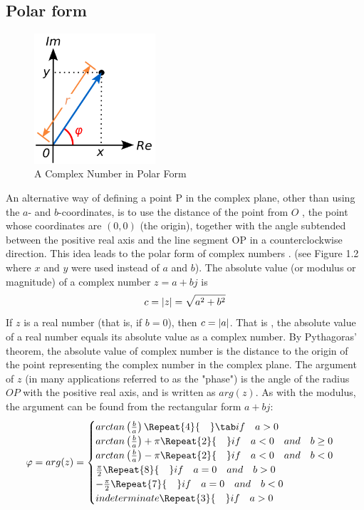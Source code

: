 \documentclass[12pt,oneside,openany]{memoir}
\numberwithin{equation}{subsection}
\DeclarePairedDelimiter{\abs}{\lvert}{\rvert}
\newcommand{\quads}[1]{\Repeat{#1}{\quad}}
\begin{document}
\subsection{Polar form}
\begin{figure}
	\centering
	\captionsetup{justification=centering}
	\includegraphics[width=0.4\textwidth]{images/complex_number_polar_form.png}
	\caption{A Complex Number in Polar Form}
\end{figure}
An alternative way of defining a point P in the complex plane, other than using
the \(a\)- and \(b\)-coordinates, is to use the distance of the point from \(O\)
, the point whose coordinates are \((0, 0)\) (the origin), together with the
angle subtended between the positive real axis and the line segment OP in a
counterclockwise direction. This idea leads to the polar form of complex numbers
. (see Figure 1.2 where \(x\) and \(y\) were used instead of \(a\) and \(b\)).
\bigbreak
The absolute value (or modulus or magnitude) of a complex number \(z = a + bj\)
is
\[c = \abs{z} = \sqrt{a^2 + b^2}\]
If \(z\) is a real number (that is, if \(b = 0\)), then \(c = \abs{a}\). That is
, the absolute value of a real number equals its absolute value as a complex
number. By Pythagoras' theorem, the absolute value of complex number is the
distance to the origin of the point representing the complex number in the
complex plane. 
\bigbreak
The argument of \(z\) (in many applications referred to as the "phase") is the
angle of the radius \(OP\) with the positive real axis, and is written as
\(arg(z)\). As with the modulus, the argument can be found from the rectangular
form \(a + bj\):
\[
	\varphi = arg(z) =
	\begin{cases}
		arctan\left(\frac{b}{a}\right) \quads{4} \tab if \quad a > 0\\
		arctan\left(\frac{b}{a}\right) + \pi \quads{2} if \quad a < 0 \quad and \quad b \geq 0\\
		arctan\left(\frac{b}{a}\right) - \pi \quads{2} if \quad a < 0 \quad and \quad b < 0\\
		\frac{\pi}{2} \quads{8} if \quad a = 0 \quad and \quad b > 0\\
		-\frac{\pi}{2} \quads{7}  if \quad a = 0 \quad and \quad b < 0\\
		indeterminate \quads{3} if \quad a > 0
	 \end{cases}
\]
\end{document}
